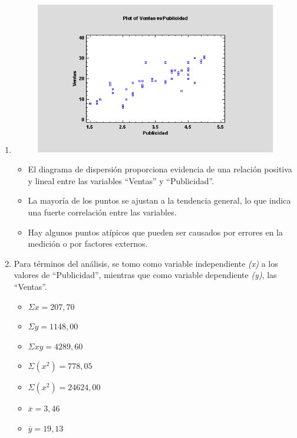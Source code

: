 \documentclass[conference]{IEEEtran}
\begin{document}
\begin{enumerate}
	\item \hfill{}
	      \begin{figure}[H]
		      \begin{center}
			      \includegraphics[width=\linewidth]{./Images/DiagramaDispersion.png}
		      \end{center}
	      \end{figure}

	      \begin{itemize}
		      \item El diagrama de dispersión proporciona evidencia de una relación
		            positiva y lineal entre las variables ``Ventas'' y ``Publicidad''.

		      \item La mayoría de los puntos se ajustan a la tendencia general, lo que
		            indica una fuerte correlación entre las variables.

		      \item Hay algunos puntos atípicos que pueden ser causados por errores en
		            la medición o por factores externos.
	      \end{itemize}

	\item Para términos del análisis, se tomo como variable
	      independiente \textit{(x)} a los valores de ``Publicidad'', mientras
	      que como variable dependiente \textit{(y)}, las ``Ventas''.

	      \begin{itemize}
		      \item $\Sigma x = 207,70$
		      \item $\Sigma y = 1148,00$
		      \item $\Sigma xy = 4289,60$
		      \item $\Sigma (x^{2}) = 778,05$
		      \item $\Sigma (x^{2}) = 24624,00$
		      \item $\overline{x} = 3,46$
		      \item $\overline{y} = 19,13$
	      \end{itemize}


\end{enumerate}
\end{document}

